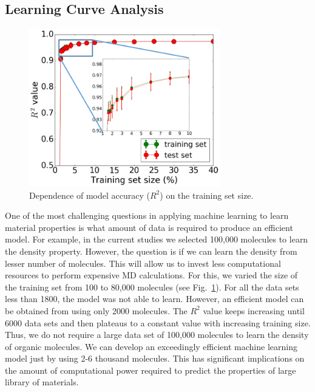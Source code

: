 \subsection{Learning Curve Analysis}
\label{subsec:number_of_molecules}

\begin{figure}[htbp] 
	\centering
	\includegraphics[width=0.744\textwidth]{Chapter-6/Figures/Learning_curve_new.png}
	\caption{Dependence of model accuracy ($R^{2}$) on the training set size.} 
	\label{fig:Learning_curve} 
\end{figure}  

One of the most challenging questions in applying machine learning to learn material properties is what amount of data is required to produce an efficient model. For example, in the current studies we selected 100,000 molecules to learn the density property. However, the question is if we can learn the density from lesser number of molecules. This will allow us to invest less computational resources to perform expensive MD calculations. For this, we varied the size of the training set from 100 to 80,000 molecules (see Fig.\ \ref{fig:Learning_curve}). For all the data sets less than 1800, the model was not able to learn. However, an efficient model can be obtained from using only 2000 molecules. The $R^2$ value keeps increasing until 6000 data sets and then plateaus to a constant value with increasing training size. Thus, we do not require a large data set of 100,000 molecules to learn the density of organic molecules. We can develop an exceedingly efficient machine learning model just by using 2-6 thousand molecules. This has significant implications on the amount of computational power required to predict the properties of large library of materials. 


